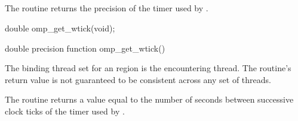 \subsection{}
\label{subsec:omp_get_wtick}
\summary
The  routine returns the precision of the timer used by 
.

\format
\begin{ccppspecific}
\begin{boxedcode}
double omp\_get\_wtick(void);
\end{boxedcode}
\end{ccppspecific}

\begin{fortranspecific}
\begin{boxedcode}
double precision function omp\_get\_wtick()
\end{boxedcode}
\end{fortranspecific}

\binding
The binding thread set for an  region is the encountering thread. The 
routine's return value is not guaranteed to be consistent across any set of threads.

\effect
The  routine returns a value equal to the number of seconds between 
successive clock ticks of the timer used by .













